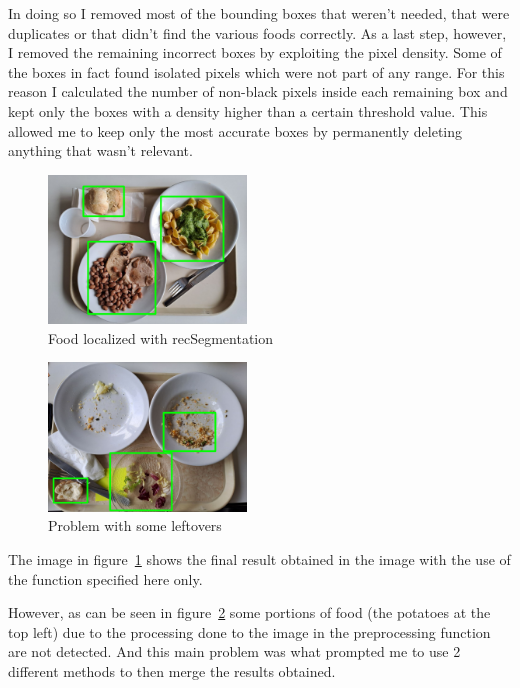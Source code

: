 \documentclass[
	a4paper, %
	10pt, %
	unnumberedsections, %
	twoside, %
]{LTJournalArticle}
\begin{document}
In doing so I removed most of the bounding boxes that weren't needed, that were duplicates or that didn't find the various foods correctly. As a last step, however, I removed the remaining incorrect boxes by exploiting the pixel density. Some of the boxes in fact found isolated pixels which were not part of any range. For this reason I calculated the number of non-black pixels inside each remaining box and kept only the boxes with a density higher than a certain threshold value. This allowed me to keep only the most accurate boxes by permanently deleting anything that wasn't relevant.

\begin{figure}[t]
    \centering
    \includegraphics[width=0.47\textwidth]{Images/RecBoxes_tray1.1.jpg}
    \caption{Food localized with recSegmentation}
    \label{fig:RecBoxes11}
\end{figure}

\begin{figure}[t]
    \centering
    \includegraphics[width=0.47\textwidth]{Images/RecBoxes_tray4.4.jpg}
    \caption{Problem with some leftovers}
    \label{fig:RecBoxes_tray4.4}
\end{figure}

The image in figure~\ref{fig:RecBoxes11} shows the final result obtained in the image with the use of the function specified here only.

However, as can be seen in figure~\ref{fig:RecBoxes_tray4.4} some portions of food (the potatoes at the top left) due to the processing done to the image in the preprocessing function are not detected. And this main problem was what prompted me to use 2 different methods to then merge the results obtained.
\end{document}
